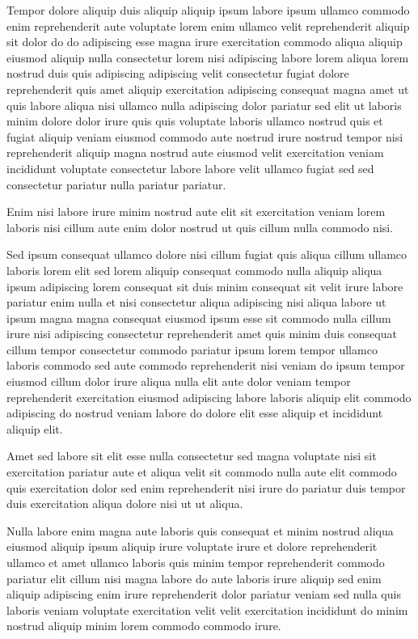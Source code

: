 \documentclass{article}
\begin{document}
Tempor dolore aliquip duis aliquip aliquip ipsum labore ipsum ullamco commodo enim reprehenderit aute voluptate lorem enim ullamco velit reprehenderit aliquip sit dolor do do adipiscing esse magna irure exercitation commodo aliqua aliquip eiusmod aliquip nulla consectetur lorem nisi adipiscing labore lorem aliqua lorem nostrud duis quis adipiscing adipiscing velit consectetur fugiat dolore reprehenderit quis amet aliquip exercitation adipiscing consequat magna amet ut quis labore aliqua nisi ullamco nulla adipiscing dolor pariatur sed elit ut laboris minim dolore dolor irure quis quis voluptate laboris ullamco nostrud quis et fugiat aliquip veniam eiusmod commodo aute nostrud irure nostrud tempor nisi reprehenderit aliquip magna nostrud aute eiusmod velit exercitation veniam incididunt voluptate consectetur labore labore velit ullamco fugiat sed sed consectetur pariatur nulla pariatur pariatur.

Enim nisi labore irure minim nostrud aute elit sit exercitation veniam lorem laboris nisi cillum aute enim dolor nostrud ut quis cillum nulla commodo nisi.

Sed ipsum consequat ullamco dolore nisi cillum fugiat quis aliqua cillum ullamco laboris lorem elit sed lorem aliquip consequat commodo nulla aliquip aliqua ipsum adipiscing lorem consequat sit duis minim consequat sit velit irure labore pariatur enim nulla et nisi consectetur aliqua adipiscing nisi aliqua labore ut ipsum magna magna consequat eiusmod ipsum esse sit commodo nulla cillum irure nisi adipiscing consectetur reprehenderit amet quis minim duis consequat cillum tempor consectetur commodo pariatur ipsum lorem tempor ullamco laboris commodo sed aute commodo reprehenderit nisi veniam do ipsum tempor eiusmod cillum dolor irure aliqua nulla elit aute dolor veniam tempor reprehenderit exercitation eiusmod adipiscing labore laboris aliquip elit commodo adipiscing do nostrud veniam labore do dolore elit esse aliquip et incididunt aliquip elit.

Amet sed labore sit elit esse nulla consectetur sed magna voluptate nisi sit exercitation pariatur aute et aliqua velit sit commodo nulla aute elit commodo quis exercitation dolor sed enim reprehenderit nisi irure do pariatur duis tempor duis exercitation aliqua dolore nisi ut ut aliqua.

Nulla labore enim magna aute laboris quis consequat et minim nostrud aliqua eiusmod aliquip ipsum aliquip irure voluptate irure et dolore reprehenderit ullamco et amet ullamco laboris quis minim tempor reprehenderit commodo pariatur elit cillum nisi magna labore do aute laboris irure aliquip sed enim aliquip adipiscing enim irure reprehenderit dolor pariatur veniam sed nulla quis laboris veniam voluptate exercitation velit velit exercitation incididunt do minim nostrud aliquip minim lorem commodo commodo irure.
\end{document}

